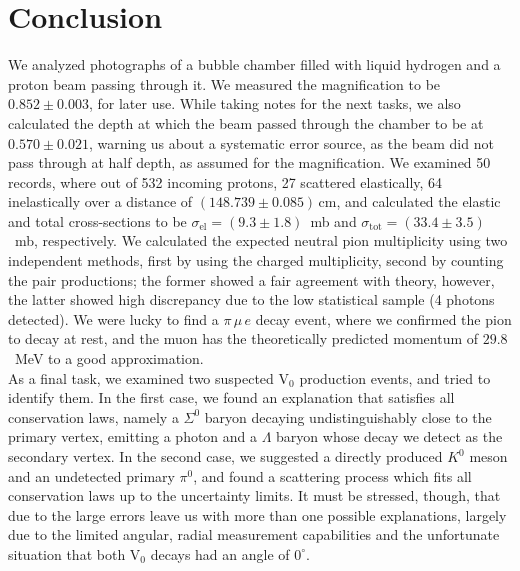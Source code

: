 \documentclass[twocolumn]{article}
\begin{document}
\section{Conclusion}
We analyzed photographs of a bubble chamber filled with liquid hydrogen and a proton beam passing through it. We measured the magnification to be $0.852 \pm 0.003$, for later use. While taking notes for the next tasks, we also calculated the depth at which the beam passed through the chamber to be at $0.570 \pm 0.021$, warning us about a systematic error source, as the beam did not pass through at half depth, as assumed for the magnification. We examined 50 records, where out of 532 incoming protons, 27 scattered elastically, 64 inelastically over a distance of $(148.739 \pm 0.085)\,$cm, and calculated the elastic and total cross-sections to be  $\sigma_{\text{el}} = (9.3 \pm 1.8)$~mb and $\sigma_{\text{tot}} = (33.4 \pm 3.5)$~mb, respectively. We calculated the expected neutral pion multiplicity using two independent methods, first by using the charged multiplicity, second by counting the pair productions; the former showed a fair agreement with theory, however, the latter showed high discrepancy due to the low statistical sample (4 photons detected). We were lucky to find a $\pi \, \mu \, e$ decay event, where we confirmed the pion to decay at rest, and the muon has the theoretically predicted momentum of  $29.8$~MeV to a good approximation.\\
As a final task, we examined two suspected V$_0$ production events, and tried to identify them. In the first case, we found an explanation that satisfies all conservation laws, namely a $\Sigma^0$ baryon decaying undistinguishably close to the primary vertex, emitting a photon and a $\Lambda$ baryon whose decay we detect as the secondary vertex. In the second case, we suggested a directly produced $K^0$ meson and an undetected primary $\pi^0$, and found a scattering process which fits all conservation laws up to the uncertainty limits. It must be stressed, though, that due to the large errors leave us with more than one possible explanations, largely due to the limited angular, radial measurement capabilities and the unfortunate situation that both V$_0$ decays had an angle of $0^{\circ}$.
\end{document}
